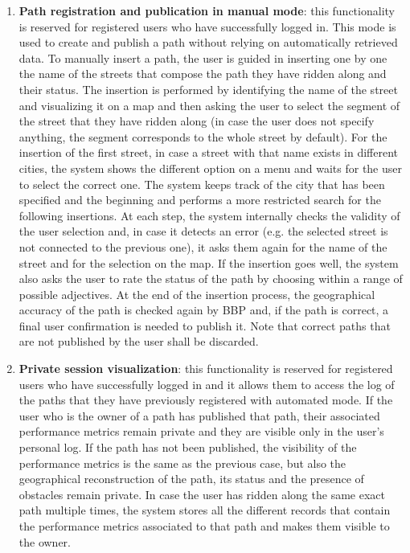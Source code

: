 \documentclass{article}
\begin{document}
\begin{enumerate}
    \item \textbf{Path registration and publication in manual mode}: this functionality is reserved for registered users who have successfully logged in. This mode is used to create and publish a path without relying on automatically retrieved data. To manually insert a path, the user is guided in inserting one by one the name of the streets that compose the path they have ridden along and their status. The insertion is performed by identifying the name of the street and visualizing it on a map and then asking the user to select the segment of the street that they have ridden along (in case the user does not specify anything, the segment corresponds to the whole street by default). For the insertion of the first street, in case a street with that name exists in different cities, the system shows the different option on a menu and waits for the user to select the correct one. The system keeps track of the city that has been specified and the beginning and performs a more restricted search for the following insertions. At each step, the system internally checks the validity of the user selection and, in case it detects an error (e.g. the selected street is not connected to the previous one), it asks them again for the name of the street and for the selection on the map. If the insertion goes well, the system also asks the user to rate the status of the path by choosing within a range of possible adjectives. At the end of the insertion process, the geographical accuracy of the path is checked again by BBP and, if the path is correct, a final user confirmation is needed to publish it. Note that correct paths that are not published by the user shall be discarded.
    \item \textbf{Private session visualization}: this functionality is reserved for registered users who have successfully logged in and it allows them to access the log of the paths that they have previously registered with automated mode. If the user who is the owner of a path has published that path, their associated performance metrics remain private and they are visible only in the user's personal log. If the path has not been published, the visibility of the performance metrics is the same as the previous case, but also the geographical reconstruction of the path, its status and the presence of obstacles remain private. In case the user has ridden along the same exact path multiple times, the system stores all the different records that contain the performance metrics associated to that path and makes them visible to the owner.

\end{enumerate}
\end{document}
